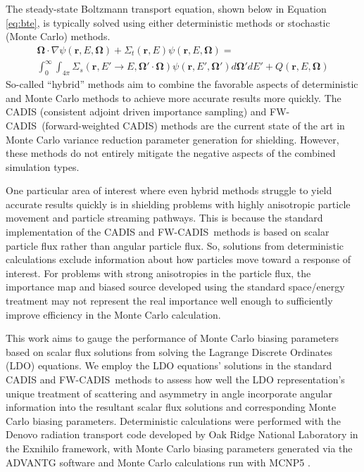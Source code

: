 \documentclass{article} %
\newcommand{\bo}{\mathbf\Omega}
\newcommand{\vecr}{\textbf{r}}
\newcommand{\fwc}{\mbox{FW-CADIS}}
\begin{document}
The steady-state Boltzmann transport equation, shown below in Equation
\eqref{eq:bte}, is typically solved using either deterministic methods or
stochastic (Monte Carlo) methods.
%
\begin{multline}
\bo \cdot \nabla \psi(\vecr,E,\bo) + \Sigma_t(\vecr,E) \psi(\vecr,E,\bo) = \\
\int_0^\infty\int_{4\pi} \Sigma_s(\vecr,E'\rightarrow E,\bo'\cdot\bo)
\psi(\vecr,E',\bo')d\bo'dE' + Q(\vecr,E,\bo)
\label{eq:bte}
\end{multline}
%
So-called ``hybrid'' methods aim to combine the favorable aspects of
deterministic and Monte Carlo methods to achieve more accurate results more
quickly. The CADIS (consistent adjoint driven importance sampling) and \fwc\
(forward-weighted CADIS) methods are the current state of the art in Monte
Carlo variance reduction parameter generation for shielding. However, these
methods do not entirely mitigate the negative aspects of the combined
simulation types.

One particular area of interest where even hybrid methods struggle to yield
accurate results quickly is in shielding problems with highly anisotropic
particle movement and particle streaming pathways. This is because the
standard implementation of the CADIS and \fwc\ methods is based on scalar
particle flux rather than angular particle flux. So, solutions from
deterministic calculations exclude information about how particles move toward
a response of interest. For problems with strong anisotropies in the particle
flux, the importance map and biased source  developed using the standard
space/energy treatment may not represent the real importance well enough to
sufficiently improve efficiency in the Monte Carlo calculation.

This work aims to gauge the performance of Monte Carlo biasing parameters
based on scalar flux solutions from solving the Lagrange Discrete Ordinates
(LDO) equations.  We employ the LDO equations' solutions in the standard CADIS
and \fwc\ methods to assess how well the LDO representation's unique treatment
of scattering and asymmetry in angle incorporate angular information into the
resultant scalar flux solutions and corresponding Monte Carlo biasing
parameters. Deterministic calculations were performed with the Denovo
radiation transport code developed by Oak Ridge National Laboratory
\cite{denovo} in the Exnihilo framework, with Monte Carlo biasing parameters
generated via the ADVANTG software \cite{advantg} and Monte Carlo calculations
run with MCNP5 \cite{mcnp}.
\end{document}
